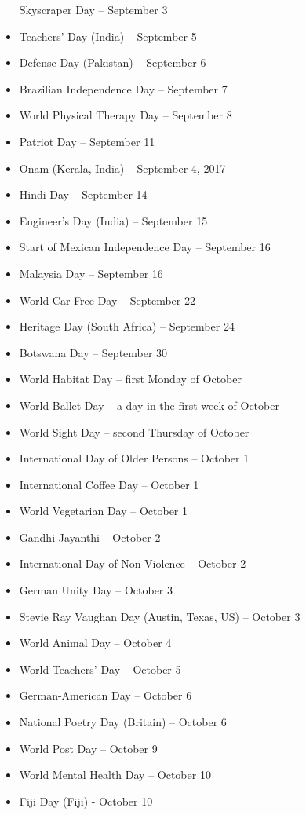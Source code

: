 \documentclass[
  openany]{book}
\begin{document}
\begin{itemize}
  Skyscraper Day -- September 3
\item
  Teachers' Day (India) -- September 5
\item
  Defense Day (Pakistan) -- September 6
\item
  Brazilian Independence Day -- September 7
\item
  World Physical Therapy Day -- September 8
\item
  Patriot Day -- September 11
\item
  Onam (Kerala, India) -- September 4, 2017
\item
  Hindi Day -- September 14
\item
  Engineer's Day (India) -- September 15
\item
  Start of Mexican Independence Day -- September 16
\item
  Malaysia Day -- September 16
\item
  World Car Free Day -- September 22
\item
  Heritage Day (South Africa) -- September 24
\item
  Botswana Day -- September 30
\item
  World Habitat Day -- first Monday of October
\item
  World Ballet Day -- a day in the first week of October
\item
  World Sight Day -- second Thursday of October
\item
  International Day of Older Persons -- October 1
\item
  International Coffee Day -- October 1
\item
  World Vegetarian Day -- October 1
\item
  Gandhi Jayanthi -- October 2
\item
  International Day of Non-Violence -- October 2
\item
  German Unity Day -- October 3
\item
  Stevie Ray Vaughan Day (Austin, Texas, US) -- October 3
\item
  World Animal Day -- October 4
\item
  World Teachers' Day -- October 5
\item
  German-American Day -- October 6
\item
  National Poetry Day (Britain) -- October 6
\item
  World Post Day -- October 9
\item
  World Mental Health Day -- October 10
\item
  Fiji Day (Fiji) - October 10

\end{itemize}
\end{document}
